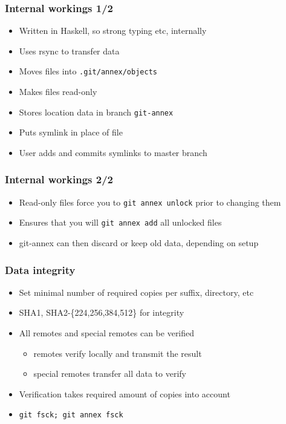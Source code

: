 \documentclass[t]{beamer}
\begin{document}
\begin{frame}
	\frametitle{Internal workings 1/2}
	\begin{itemize}
		\item Written in Haskell, so strong typing etc, internally
		\item Uses rsync to transfer data
		\item Moves files into \texttt{.git/annex/objects}
		\item Makes files read-only
		\item Stores location data in branch \texttt{git-annex}
		\item Puts symlink in place of file
		\item User adds and commits symlinks to master branch
	\end{itemize}
\end{frame}

\begin{frame}
	\frametitle{Internal workings 2/2}
	\begin{itemize}
		\item Read-only files force you to \texttt{git annex unlock} prior to changing them
		\item Ensures that you will \texttt{git annex add} all unlocked files
		\item git-annex can then discard or keep old data, depending on setup
	\end{itemize}
\end{frame}

\begin{frame}
	\frametitle{Data integrity}
	\begin{itemize}
		\item Set minimal number of required copies per suffix, directory, etc
		\item SHA1, SHA2-\{224,256,384,512\} for integrity
		\item All remotes and special remotes can be verified
		\begin{itemize}
			\item remotes verify locally and transmit the result
			\item special remotes transfer all data to verify
		\end{itemize}
		\item Verification takes required amount of copies into account
		\item \texttt{git fsck; git annex fsck}
	\end{itemize}
\end{frame}
\end{document}
